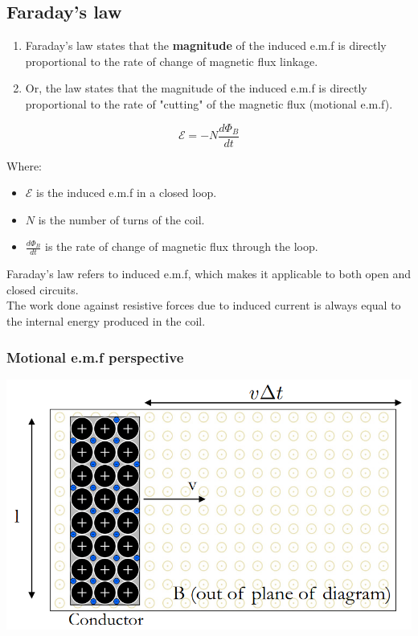 \documentclass[11pt]{article}
\begin{document}
\subsection{Faraday's law}
\label{sec:org0514a73}
\begin{enumerate}
\item Faraday's law states that the \textbf{magnitude} of the induced e.m.f is directly proportional to the rate of change of magnetic flux linkage.
\item Or, the law states that the magnitude of the induced e.m.f is directly proportional to the rate of "cutting" of the magnetic flux (motional e.m.f).
\end{enumerate}

\[\mathcal{E} = - N \frac{d \Phi_B}{dt}\]

Where:
\begin{itemize}
\item \(\mathcal{E}\) is the induced e.m.f in a closed loop.
\item \(N\) is the number of turns of the coil.
\item \(\frac{d \Phi_B}{dt}\) is the rate of change of magnetic flux through the loop.
\end{itemize}

Faraday's law refers to induced e.m.f, which makes it applicable to both open and closed circuits.
\\[0pt]

The work done against resistive forces due to induced current is always equal to the internal energy produced in the coil.

\newpage

\subsubsection{Motional e.m.f perspective}
\label{sec:orgec5d16d}

\begin{center}
\includegraphics[scale=0.65]{./images/motional-emf.png}
\end{center}
\end{document}
